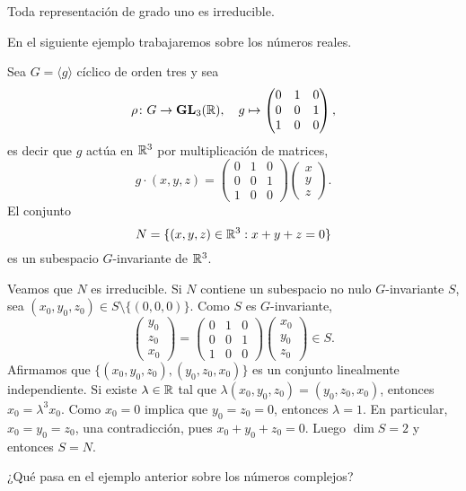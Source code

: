 \begin{example}
  Toda representación de grado uno es irreducible.
\end{example}

En el siguiente ejemplo trabajaremos sobre los números reales. 

\begin{example}
Sea $G=\langle g\rangle$ cíclico de orden tres y sea 
\[
\rho\colon G\to\mathbf{GL}_3(\mathbb{R}),\quad
g\mapsto\begin{pmatrix}
  0&1&0\\
  0&0&1\\
  1&0&0
\end{pmatrix},
\]
es decir que $g$ actúa en $\mathbb{R}^{3}$ por multiplicación de matrices,
\[
g\cdot (x,y,z)=
\begin{pmatrix}
  0&1&0\\
  0&0&1\\
  1&0&0
\end{pmatrix}\begin{pmatrix}
x\\
y\\
z
\end{pmatrix}.
\]
El conjunto
\[
N=\{(x,y,z)\in\mathbb{R}^{3}:x+y+z=0\}
\]
es un subespacio $G$-invariante de $\mathbb{R}^3$. 

Veamos que $N$ es irreducible. 
Si $N$ contiene un subespacio no nulo $G$-invariante $S$, 
sea $(x_0,y_0,z_0)\in S\setminus\{(0,0,0)\}$. Como $S$ es $G$-invariante, 
\[
\begin{pmatrix}
y_0\\
z_0\\
x_0
\end{pmatrix}
=
\begin{pmatrix}
  0&1&0\\
  0&0&1\\
  1&0&0
\end{pmatrix}
\begin{pmatrix}
x_0\\
y_0\\
z_0
\end{pmatrix}\in S.
\]
Afirmamos
que $\{(x_0,y_0,z_0),(y_0,z_0,x_0)\}$ es un conjunto linealmente independiente. Si existe $\lambda\in\mathbb{R}$ 
tal que $\lambda(x_0,y_0,z_0)=(y_0,z_0,x_0)$, entonces $x_0=\lambda^3 x_0$. Como $x_0=0$ implica que 
$y_0=z_0=0$, entonces $\lambda=1$. En particular, $x_0=y_0=z_0$, una contradicción, pues $x_0+y_0+z_0=0$. 
Luego $\dim S=2$ y entonces
$S=N$. 
\end{example}

\begin{exercise}
    ¿Qué pasa en el ejemplo anterior sobre los números complejos?
\end{exercise}


